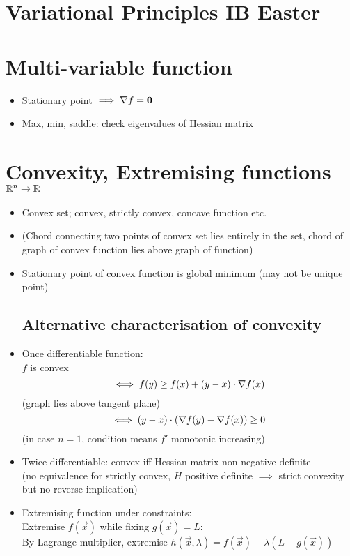 



\section*{Variational Principles \hfill IB Easter}

\section{Multi-variable function}
\begin{itemize}
    \item Stationary point $\implies \mathbf{\nabla} f = \boldsymbol{\mathbf{0}}$
    \item Max, min, saddle: check eigenvalues of Hessian matrix
\end{itemize}

\section{Convexity, Extremising functions $\mathbb{R}^n \to \mathbb{R}$}
\begin{itemize}
    \item Convex set; convex, strictly convex, concave function etc.
    \item (Chord connecting two points of convex set lies entirely in the set, chord of graph of convex function lies above graph of function)
    \item Stationary point of convex function is global minimum (may not be unique point)
          \subsection*{Alternative characterisation of convexity}
    \item Once differentiable function: \\
          $f$ is convex
          \[\iff f(y) \geq f(x) + (y-x) \cdot \mathbf{\nabla} f (x)\] (graph lies above tangent plane)
          \[\iff (y-x) \cdot (\mathbf{\nabla} f(y) - \mathbf{\nabla} f (x)) \geq 0\] (in case $n = 1$, condition means $f'$ monotonic increasing)
    \item Twice differentiable: convex iff Hessian matrix non-negative definite \\
          (no equivalence for strictly convex, $H$ positive definite $\implies$ strict convexity but no reverse implication)
    \item Extremising function under constraints: \\
          Extremise $f(\vec{x})$ while fixing $g(\vec{x})=L$:\\
          By Lagrange multiplier, extremise $h(\vec{x}, \lambda) = f(\vec{x}) -\lambda (L-g(\vec{x}))$
\end{itemize}

